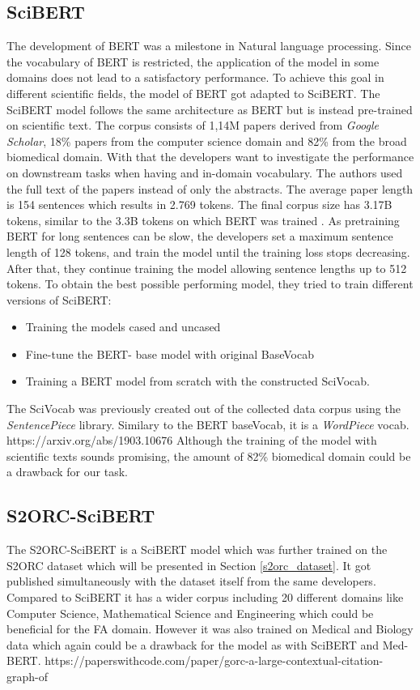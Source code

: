 \subsection{SciBERT}
The development of BERT was a milestone in Natural language processing. Since the vocabulary of BERT is restricted, the application of the model in some domains does not lead to a satisfactory performance. To achieve this goal in different scientific fields, the model of BERT got adapted to SciBERT. The SciBERT model follows the same architecture as BERT but is instead pre-trained on scientific text. The corpus consists of 1,14M papers derived from \textit{Google Scholar}, 18\% papers from the computer science domain and 82\% from the broad biomedical domain. With that the developers want to investigate the performance on downstream tasks when having and in-domain vocabulary. The authors used the full text of the papers instead of only the abstracts. The average paper length is 154 sentences which results in 2.769 tokens. The final corpus size has 3.17B tokens, similar to the 3.3B tokens on which BERT was trained \cite{Beltagy}. \newline
As pretraining BERT for long sentences can be slow, the developers set a maximum sentence length of 128 tokens, and train the model until the training loss stops decreasing. After that, they continue training the model allowing sentence lengths up to 512 tokens. To obtain the best possible performing model, they tried to train different versions of SciBERT:

\begin{itemize}
	\item Training the models cased and uncased
	\item Fine-tune the BERT- base model with original BaseVocab
	\item Training a BERT model from scratch with the constructed SciVocab.
\end{itemize}

The SciVocab was previously created out of the collected data corpus using the \textit{SentencePiece} library. Similary to the BERT baseVocab, it is a \textit{WordPiece} vocab. \alert{https://arxiv.org/abs/1903.10676} \newline
Although the training of the model with scientific texts sounds promising, the amount of 82\% biomedical domain could be a drawback for our task.

\subsection{S2ORC-SciBERT}
The S2ORC-SciBERT is a SciBERT model which was further trained on the S2ORC dataset which will be presented in Section \ref{s2orc_dataset}. It got published simultaneously with the dataset itself from the same developers. Compared to SciBERT it has a wider corpus including 20 different domains like Computer Science, Mathematical Science and Engineering which could be beneficial for the FA domain. However it was also trained on Medical and Biology data which again could be a drawback for the model as with SciBERT and Med-BERT.
\alert{https://paperswithcode.com/paper/gorc-a-large-contextual-citation-graph-of}

